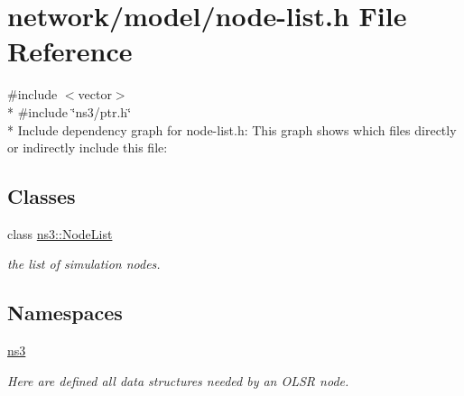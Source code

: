 \hypertarget{node-list_8h}{}\section{network/model/node-\/list.h File Reference}
\label{node-list_8h}
{\ttfamily \#include $<$vector$>$}\\*
{\ttfamily \#include \char`\"{}ns3/ptr.\+h\char`\"{}}\\*
Include dependency graph for node-\/list.h\+:
This graph shows which files directly or indirectly include this file\+:
\subsection*{Classes}
\begin{DoxyCompactItemize}
\item 
class \hyperlink{classns3_1_1NodeList}{ns3\+::\+Node\+List}
\begin{DoxyCompactList}\small\item\em the list of simulation nodes. \end{DoxyCompactList}\end{DoxyCompactItemize}
\subsection*{Namespaces}
\begin{DoxyCompactItemize}
\item 
 \hyperlink{namespacens3}{ns3}
\begin{DoxyCompactList}\small\item\em Here are defined all data structures needed by an O\+L\+SR node. \end{DoxyCompactList}\end{DoxyCompactItemize}
